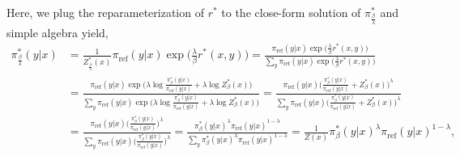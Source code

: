 Here, we plug the reparameterization of $r^*$ to the close-form solution of $\pi^*_\frac{\beta}{\lambda}$ and simple algebra yield,
\begin{equation*}
\begin{split}
\pi^*_\frac{\beta}{\lambda} (y | x) &= \frac{1}{Z^*_\frac{\beta}{\lambda}(x)}\pi_{\text{ref}}(y | x) \exp \big(\frac{\lambda}{\beta}r^*(x, y)\big) = \frac{\pi_{\text{ref}}(y | x) \exp \big(\frac{\lambda}{\beta}r^*(x, y)\big)}{\sum_{y} \pi_{\text{ref}}(y | x) \exp \big(\frac{\lambda}{\beta}r^*(x, y)\big)} \\
&= \frac{\pi_{\text{ref}}(y | x) \exp \big(\lambda \log \frac{\pi^*_\beta (y | x)}{\pi_{\text{ref}}(y | x) } + \lambda \log Z^*_\beta(x)\big)}{\sum_{y} \pi_{\text{ref}}(y | x) \exp \big(\lambda \log \frac{\pi^*_\beta (y | x)}{\pi_{\text{ref}}(y | x) } + \lambda \log Z^*_\beta(x)\big)} = \frac{\pi_{\text{ref}}(y | x) \big(\frac{\pi^*_\beta (y | x)}{\pi_{\text{ref}}(y | x) } + Z^*_\beta(x) \big)^\lambda}{\sum_{y} \pi_{\text{ref}}(y | x) \big(\frac{\pi^*_\beta (y | x)}{\pi_{\text{ref}}(y | x) } + Z^*_\beta(x) \big)^\lambda} \\
&= \frac{\pi_{\text{ref}}(y | x) \big(\frac{\pi^*_\beta (y | x)}{\pi_{\text{ref}}(y | x) } \big)^\lambda}{\sum_{y} \pi_{\text{ref}}(y | x) \big(\frac{\pi^*_\beta (y | x)}{\pi_{\text{ref}}(y | x) } \big)^\lambda} = \frac{\pi^*_\beta (y | x)^\lambda \pi_{\text{ref}}(y | x)^{1-\lambda}}{\sum_{y} \pi^*_\beta (y | x)^\lambda \pi_{\text{ref}}(y | x)^{1-\lambda}} = \frac{1}{Z(x)} \pi^*_\beta (y | x)^\lambda \pi_{\text{ref}}(y | x)^{1-\lambda}, \\
\end{split}
\end{equation*}

